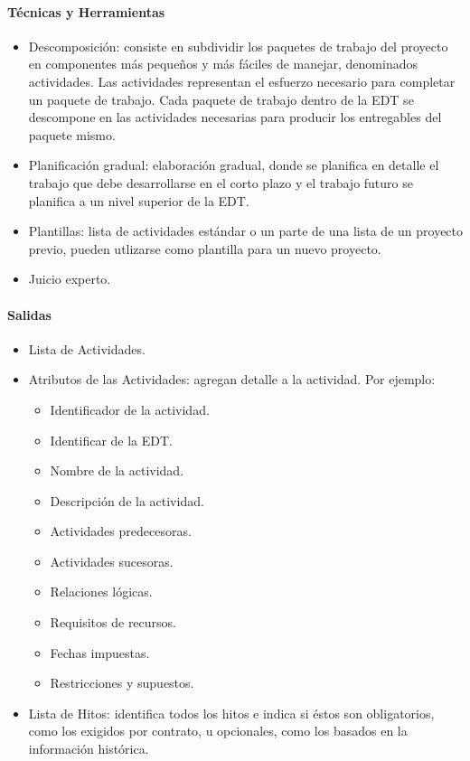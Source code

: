 \documentclass[a4paper,twosides]{article}
\newlength{\wideitemsep}
\let\olditem\item
\renewcommand{\item}{\setlength{\itemsep}{\wideitemsep}\olditem}
\begin{document}
\paragraph{Técnicas y Herramientas}
\begin{itemize}
\item Descomposición: consiste en subdividir los paquetes de trabajo del proyecto en componentes más pequeños y más fáciles de manejar, denominados actividades. Las actividades representan el esfuerzo necesario para completar un paquete de trabajo. Cada paquete de trabajo dentro de la EDT se descompone en las actividades necesarias para producir los entregables del paquete mismo.
\item Planificación gradual: elaboración gradual, donde se planifica en detalle el trabajo que debe desarrollarse en el corto plazo y el trabajo futuro se planifica a un nivel superior de la EDT.
\item Plantillas: lista de actividades estándar o un parte de una lista de un proyecto previo, pueden utlizarse como plantilla para un nuevo proyecto.
\item Juicio experto.
\end{itemize}

\paragraph{Salidas}
\begin{itemize}
\item Lista de Actividades.
\item Atributos de las Actividades: agregan detalle a la actividad. Por ejemplo:
\begin{itemize}
\item Identificador de la actividad.
\item Identificar de la EDT.
\item Nombre de la actividad.
\item Descripción de la actividad.
\item Actividades predecesoras.
\item Actividades sucesoras.
\item Relaciones lógicas.
\item Requisitos de recursos.
\item Fechas impuestas.
\item Restricciones y supuestos.
\end{itemize}
\item Lista de Hitos: identifica todos los hitos e indica si éstos son obligatorios, como los exigidos por contrato, u opcionales, como los basados en la información histórica.
\end{itemize}
\end{document}

